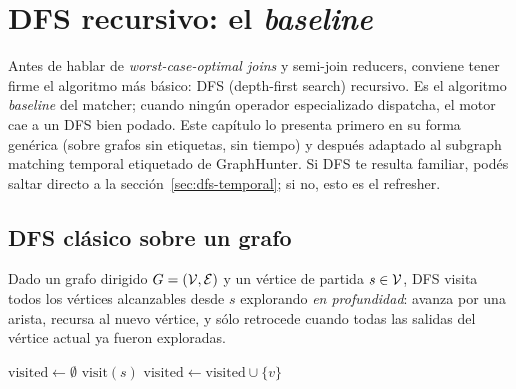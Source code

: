 \chapter{DFS recursivo: el \emph{baseline}}
\label{cap:dfs-baseline}

\begin{intuicion}
Antes de hablar de \emph{worst-case-optimal joins} y semi-join
reducers, conviene tener firme el algoritmo más básico: DFS
(depth-first search) recursivo. Es el algoritmo \emph{baseline} del
matcher; cuando ningún operador especializado dispatcha, el motor
cae a un DFS bien podado. Este capítulo lo presenta primero en su
forma genérica (sobre grafos sin etiquetas, sin tiempo) y después
adaptado al subgraph matching temporal etiquetado de GraphHunter.
Si DFS te resulta familiar, podés saltar directo a la
sección~\ref{sec:dfs-temporal}; si no, esto es el refresher.
\end{intuicion}

\section{DFS clásico sobre un grafo}

\begin{definition}[DFS]
Dado un grafo dirigido \(G = (\mathcal{V}, \mathcal{E})\) y un vértice de partida
\(s \in \mathcal{V}\), DFS visita todos los vértices alcanzables desde \(s\)
explorando \emph{en profundidad}: avanza por una arista, recursa al
nuevo vértice, y sólo retrocede cuando todas las salidas del vértice
actual ya fueron exploradas.
\end{definition}

\begin{algorithm}[H]
\caption{DFS recursivo, versión \emph{visit-all}}
\(\mathrm{visited} \leftarrow \emptyset\)\;
\(\mathrm{visit}(s)\)\;
\BlankLine
{}
\(\mathrm{visited} \leftarrow \mathrm{visited} \cup \{v\}\)\;
\end{algorithm}

